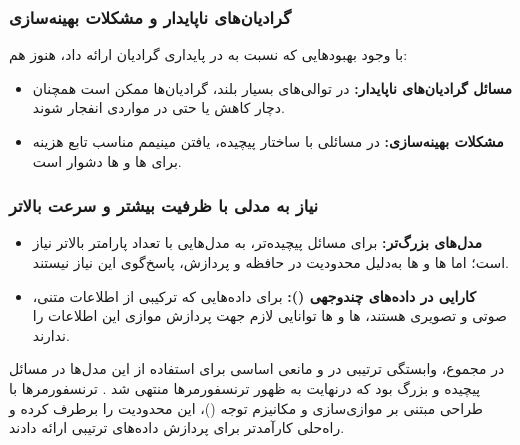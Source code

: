 \subsubsection{گرادیان‌های ناپایدار و مشکلات بهینه‌سازی}
با وجود بهبودهایی که  نسبت به  در پایداری گرادیان ارائه داد، هنوز هم:
\begin{itemize}
	\item \textbf{مسائل گرادیان‌های ناپایدار:}  
	در توالی‌های بسیار بلند، گرادیان‌ها ممکن است همچنان دچار کاهش یا حتی در مواردی انفجار شوند.
	
	\item \textbf{مشکلات بهینه‌سازی:}  
	در مسائلی با ساختار پیچیده، یافتن مینیمم مناسب تابع هزینه برای ها و ها دشوار است.
\end{itemize}

\subsubsection{نیاز به مدلی با ظرفیت بیشتر و سرعت بالاتر}
\begin{itemize}
	\item \textbf{مدل‌های بزرگ‌تر:}  
	برای مسائل پیچیده‌تر، به مدل‌هایی با تعداد پارامتر بالاتر نیاز است؛ اما ها و ها به‌دلیل محدودیت در حافظه و پردازش، پاسخ‌گوی این نیاز نیستند.
	
	\item \textbf{کارایی در داده‌های چندوجهی ():}  
	برای داده‌هایی که ترکیبی از اطلاعات متنی، صوتی و تصویری هستند، ها و ها توانایی لازم جهت پردازش موازی این اطلاعات را ندارند.
\end{itemize}

در مجموع، وابستگی ترتیبی در  و  مانعی اساسی برای استفاده از این مدل‌ها در مسائل پیچیده و بزرگ بود که درنهایت به ظهور ترنسفورمرها منتهی شد
\cite{vaswani2017attention}.
ترنسفورمرها با طراحی مبتنی بر موازی‌سازی و مکانیزم توجه ()، این محدودیت را برطرف کرده و راه‌حلی کارآمدتر برای پردازش داده‌های ترتیبی ارائه دادند.



